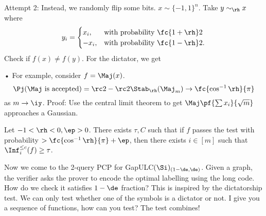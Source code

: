 Attempt 2: Instead, we randomly flip some bits. $x\sim \{-1,1\}^n$. Take $y\sim_\rh x$ where 
\[
y_i=\begin{cases}
x_i,&\text{with probability } \fc{1+\rh}2\\
-x_i,&\text{with probability } \fc{1-\rh}2.
\end{cases}
\]
Check if $f(x)\ne f(y)$. 
For the dictator, we get
•
For example, consider $f=\Maj(x)$. 
\[
\Pj(\Maj\text{ is accepted})=\rc2-\rc2\Stab_\rh(\Maj_m)\to \fc{\cos^{-1}\rh}{\pi}
\]
as $m\to \iy$.
Proof: Use the central limit theorem to get $\Maj\pf{\sum x_i}{\sqrt m}$ approaches a Gaussian.

\begin{thm}
Let $-1<\rh<0,\ep>0$. There exists $\tau,C$ such that if $f$ passes the test with probability $>\fc{\cos^{-1}\rh}{\pi}+\ep$, then there exists $i\in [m]$ such that $\Inf_i^{\le c}(f)\ge \tau$.
\end{thm}

Now we come to the 2-query PCP for GapULC$(\Si)_{(1-\de,\de)}$. Given a graph, %
the verifier asks the prover to encode the optimal labelling using the long code. How do we check it satisfies $1-\de$ fraction? This is inspired by the dictatorship test. We can only test whether one of the symbols is a dictator or not. I give you a sequence of functions, how can you test? The test combines!

